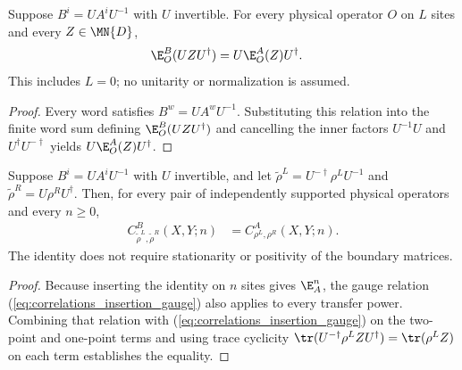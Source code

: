 \begin{lemma}
    \label{thm:physical_insertion_gauge}
    \leanok
    Suppose $B^i=UA^iU^{-1}$ with $U$ invertible. For every physical
    operator $O$ on $L$ sites and every $Z\in\MN{D}$,
    \begin{align}
        \E_O^B(UZU^\dagger) & =U\E_O^A(Z)U^\dagger.
        \label{eq:correlations_insertion_gauge}
    \end{align}
    This includes $L=0$; no unitarity or normalization is assumed.
\end{lemma}
\begin{proof}
    \leanok
    Every word satisfies $B^w=UA^wU^{-1}$. Substituting this relation into the
    finite word sum defining $\E_O^B(UZU^\dagger)$ and cancelling the inner
    factors $U^{-1}U$ and $U^\dagger U^{-\dagger}$ yields $U\E_O^A(Z)U^\dagger$.
\end{proof}

\begin{lemma}
    \label{thm:physical_correlator_gauge}
    \leanok
    Suppose $B^i=UA^iU^{-1}$ with $U$ invertible, and let
    $\widetilde\rho^L=U^{-\dagger}\rho^LU^{-1}$ and
    $\widetilde\rho^R=U\rho^RU^\dagger$. Then, for every pair of
    independently supported physical operators and every $n\geq0$,
    \begin{align}
        C_{\widetilde\rho^L,\widetilde\rho^R}^{B}(X,Y;n)
         & =C_{\rho^L,\rho^R}^{A}(X,Y;n).
        \label{eq:correlations_gauge_invariance}
    \end{align}
    The identity does not require stationarity or positivity of the
    boundary matrices.
\end{lemma}
\begin{proof}
    \leanok
    Because inserting the identity on $n$ sites gives $\E_A^n$, the gauge
    relation (\ref{eq:correlations_insertion_gauge}) also applies to every
    transfer power. Combining that relation with
    (\ref{eq:correlations_insertion_gauge}) on the two-point and one-point
    terms and using trace cyclicity
    $\tr(U^{-\dagger}\rho^LZU^\dagger)=\tr(\rho^LZ)$ on each term establishes
    the equality.
\end{proof}

